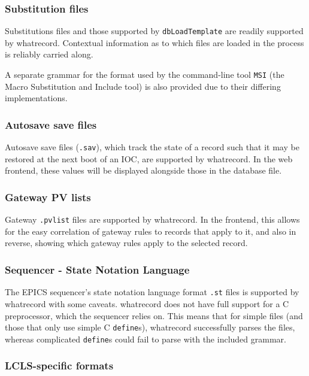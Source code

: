 \documentclass[letter,
               keeplastbox,   %
               ]{jacow}
\begin{document}
\subsubsection{Substitution files}

Substitutions files and those supported by \verb_dbLoadTemplate_ are
readily supported by whatrecord.  Contextual information as to which
files are loaded in the process is reliably carried along.

A separate grammar for the format used by the command-line tool \verb_MSI_ (the
Macro Substitution and Include tool) is also provided due to their
differing implementations.

\subsubsection{Autosave save files}

Autosave save files (\verb_.sav_), which track the state of a record such that
it may be restored at the next boot of an IOC, are supported by whatrecord.
In the web frontend, these values will be displayed alongside those in the
database file.

\subsubsection{Gateway PV lists}

Gateway \verb_.pvlist_ files are supported by whatrecord.  In the frontend,
this allows for the easy correlation of gateway rules to records that
apply to it, and also in reverse, showing which gateway rules apply to
the selected record.

\subsubsection{Sequencer - State Notation Language}

The EPICS sequencer's state notation language format \verb_.st_ files is
supported by whatrecord with some caveats.  whatrecord does not have full
support for a C preprocessor, which the sequencer relies on.  This means
that for simple files (and those that only use simple C \verb_define_s), whatrecord
successfully parses the files, whereas complicated \verb_define_s could fail
to parse with the included grammar.

\subsubsection{LCLS-specific formats}
\end{document}
